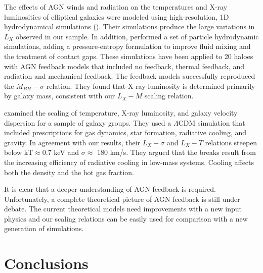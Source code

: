 \documentclass[iop]{emulateapj}
\begin{document}
The effects of AGN winds and radiation on the temperatures and X-ray luminosities of elliptical galaxies were modeled using high-resolution, 1D hydrodynamical simulations (\citealt{Pellegrini:12}). Their simulations produce the large variations in $L_X$  observed in our sample. In addition, \citet{Choi:15} performed a set of particle hydrodynamic simulations, adding a pressure-entropy formulation to improve fluid mixing and the treatment of contact gaps. These simulations have been applied to 20 haloes with AGN feedback models that included no feedback, thermal feedback, and radiation and mechanical feedback. The feedback models successfully reproduced the $M_{BH} - \sigma$ relation.  They found that X-ray luminosity is determined primarily by galaxy mass, consistent with our $L_X - M$ scaling relation. 

\citet{Dave:02} examined the scaling of temperature, X-ray luminosity, and galaxy velocity dispersion for a sample of galaxy groups. They used a $\Lambda$CDM simulation that included prescriptions for gas dynamics, star formation, radiative cooling, and gravity. In agreement with our results, their $L_X - \sigma$ and $L_X - T$ relations steepen below kT$\approx$0.7 keV and $\sigma \approx$ 180 km/s. They argued that the breaks result from the increasing efficiency of radiative cooling in low-mass systems. Cooling affects both the density and the hot gas fraction. 

It is clear that a deeper understanding of AGN feedback is required. Unfortunately, a complete theoretical picture of AGN feedback is still under debate. The current theoretical models need improvements with a new input physics and our scaling relations can be easily used for comparison with a new generation of simulations.

\section{Conclusions}\label{sec_summary}
\end{document}
